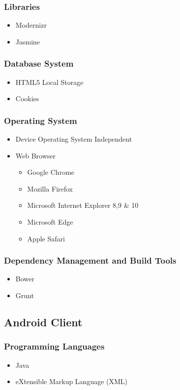 \documentclass[a4paper,10pt]{article}
\begin{document}
\subsubsection{Libraries}
	\begin{itemize}
		\item Modernizr

		\item Jasmine
	\end{itemize}

\subsubsection{Database System}
	\begin{itemize}
		\item HTML5 Local Storage
		\item Cookies
	\end{itemize}

\subsubsection{Operating System}
	\begin{itemize}
		\item Device Operating System Independent
		\item Web Browser
		\begin{itemize}
			\item Google Chrome
			\item Mozilla Firefox
			\item Microsoft Internet Explorer 8,9 \& 10
			\item Microsoft Edge
			\item Apple Safari
		\end{itemize}
	\end{itemize}

\subsubsection{Dependency Management and Build Tools}
	\begin{itemize}
		\item Bower
		\item Grunt
	\end{itemize}

\subsection{Android Client}
\subsubsection{Programming Languages}
	\begin{itemize}
		\item Java
		\item eXtensible Markup Language (XML)
	\end{itemize}
\end{document}
